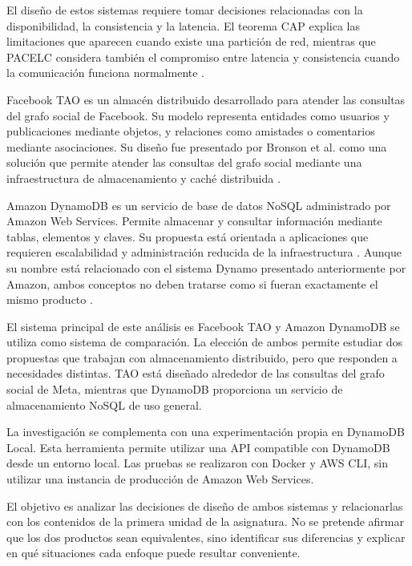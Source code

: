 \documentclass[12pt,a4paper]{article}
\begin{document}
El diseño de estos sistemas requiere tomar decisiones relacionadas con la disponibilidad, la consistencia y la latencia. El teorema CAP explica las limitaciones que aparecen cuando existe una partición de red, mientras que PACELC considera también el compromiso entre latencia y consistencia cuando la comunicación funciona normalmente \cite{brewer2012cap,abadi2012pacelc}.

Facebook TAO es un almacén distribuido desarrollado para atender las consultas del grafo social de Facebook. Su modelo representa entidades como usuarios y publicaciones mediante objetos, y relaciones como amistades o comentarios mediante asociaciones. Su diseño fue presentado por Bronson et al. como una solución que permite atender las consultas del grafo social mediante una infraestructura de almacenamiento y caché distribuida \cite{bronson2013tao}.

Amazon DynamoDB es un servicio de base de datos NoSQL administrado por Amazon Web Services. Permite almacenar y consultar información mediante tablas, elementos y claves. Su propuesta está orientada a aplicaciones que requieren escalabilidad y administración reducida de la infraestructura \cite{sivasubramanian2012dynamodb}. Aunque su nombre está relacionado con el sistema Dynamo presentado anteriormente por Amazon, ambos conceptos no deben tratarse como si fueran exactamente el mismo producto \cite{decandia2007dynamo}.

El sistema principal de este análisis es Facebook TAO y Amazon DynamoDB se utiliza como sistema de comparación. La elección de ambos permite estudiar dos propuestas que trabajan con almacenamiento distribuido, pero que responden a necesidades distintas. TAO está diseñado alrededor de las consultas del grafo social de Meta, mientras que DynamoDB proporciona un servicio de almacenamiento NoSQL de uso general.

La investigación se complementa con una experimentación propia en DynamoDB Local. Esta herramienta permite utilizar una API compatible con DynamoDB desde un entorno local. Las pruebas se realizaron con Docker y AWS CLI, sin utilizar una instancia de producción de Amazon Web Services.

El objetivo es analizar las decisiones de diseño de ambos sistemas y relacionarlas con los contenidos de la primera unidad de la asignatura. No se pretende afirmar que los dos productos sean equivalentes, sino identificar sus diferencias y explicar en qué situaciones cada enfoque puede resultar conveniente.
\end{document}
